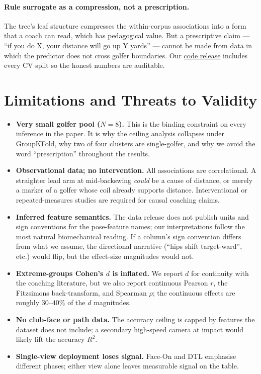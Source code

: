\documentclass[11pt,a4paper]{article}
\begin{document}
\paragraph{Rule surrogate as a compression, not a prescription.}
The tree's leaf structure compresses the within-corpus associations into a form that a coach can read, which
has pedagogical value.  But a prescriptive claim --- ``if you do X, your distance will go up Y yards'' ---
cannot be made from data in which the predictor does not cross golfer boundaries.  Our
\href{https://github.com/edwardxiong2027/caddieset-rules}{code release} includes every CV split so the
honest numbers are auditable.

\section{Limitations and Threats to Validity}
\label{sec:limits}

\begin{itemize}
    \item \textbf{Very small golfer pool ($N=8$).}  This is the binding constraint on every inference in the
          paper.  It is why the ceiling analysis collapses under GroupKFold, why two of four clusters are
          single-golfer, and why we avoid the word ``prescription'' throughout the results.
    \item \textbf{Observational data; no intervention.}  All associations are correlational.  A straighter
          lead arm at mid-backswing \emph{could} be a cause of distance, or merely a marker of a golfer whose
          coil already supports distance.  Interventional or repeated-measures studies are required for
          causal coaching claims.
    \item \textbf{Inferred feature semantics.}  The data release does not publish units and sign conventions
          for the pose-feature names; our interpretations follow the most natural biomechanical reading.  If
          a column's sign convention differs from what we assume, the directional narrative (``hips shift
          target-ward'', etc.) would flip, but the effect-size magnitudes would not.
    \item \textbf{Extreme-groups Cohen's $d$ is inflated.}  We report $d$ for continuity with the coaching
          literature, but we also report continuous Pearson $r$, the Fitzsimons back-transform, and Spearman
          $\rho$; the continuous effects are roughly $30\text{--}40\%$ of the $d$ magnitudes.
    \item \textbf{No club-face or path data.}  The accuracy ceiling is capped by features the dataset does not
          include; a secondary high-speed camera at impact would likely lift the accuracy $R^2$.
    \item \textbf{Single-view deployment loses signal.}  Face-On and DTL emphasise different phases; either
          view alone leaves measurable signal on the table.
\end{itemize}
\end{document}

